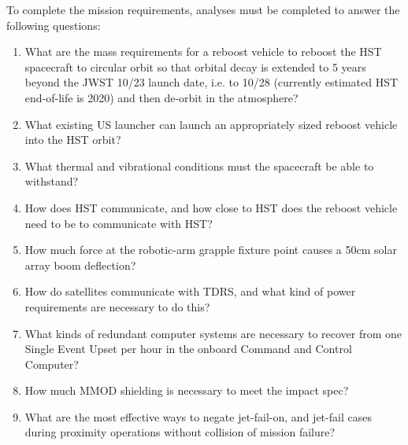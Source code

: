 \documentclass[onecolumn,10pt]{jhwhw}
\begin{document}
\clearpage
\noindent To complete the mission requirements, analyses must be completed to answer the following questions:
\begin{enumerate}
\item What are the mass requirements for a reboost vehicle to reboost the HST spacecraft to circular orbit so that orbital decay is extended to 5 years beyond the JWST 10/23 launch date, i.e. to 10/28 (currently estimated HST end-of-life is 2020) and then de-orbit in the atmosphere?
\item What existing US launcher can launch an appropriately sized reboost vehicle into the HST orbit?
\item What thermal and vibrational conditions must the spacecraft be able to withstand?
\item How does HST communicate, and how close to HST does the reboost vehicle need to be to communicate with HST?
\item How much force at the robotic-arm grapple fixture point causes a 50cm solar array boom deflection?
\item How do satellites communicate with TDRS, and what kind of power requirements are necessary to do this?
\item What kinds of redundant computer systems are necessary to recover from one Single Event Upset per hour in the onboard Command and Control Computer?
\item How much MMOD shielding is necessary to meet the impact spec?
\item What are the most effective ways to negate jet-fail-on, and jet-fail cases during proximity operations without collision of mission failure?
\end{enumerate}
\end{document}
